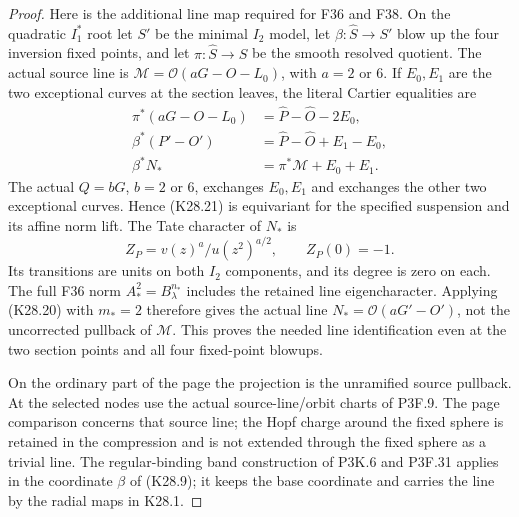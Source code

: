 \begin{proof}
Here is the additional line map required for F36 and F38. On the
quadratic \(I_1^*\) root let \(S'\) be the minimal \(I_2\) model,
let \(\beta:\widehat S\to S'\) blow up the four inversion fixed
points, and let \(\pi:\widehat S\to S\) be the smooth resolved
quotient. The actual source line is
\(\mathcal M=\mathcal O(aG-O-L_0)\), with \(a=2\) or \(6\).
If \(E_0,E_1\) are the two exceptional curves at the section leaves,
the literal Cartier equalities are
\[
 \begin{split}
 \pi^*(aG-O-L_0)&=\widehat P-\widehat O-2E_0,\\
 \beta^*(P'-O')&=\widehat P-\widehat O+E_1-E_0,\\
 \beta^*N_*&=\pi^*\mathcal M+E_0+E_1 .
 \end{split}
 \tag{K28.21}
\]
The actual \(Q=bG\), \(b=2\) or \(6\), exchanges \(E_0,E_1\)
and exchanges the other two exceptional curves. Hence (K28.21)
is equivariant for the specified suspension and its affine norm lift.
The Tate character of \(N_*\) is
\[
             Z_P=v(z)^a/u(z^2)^{a/2},\qquad Z_P(0)=-1 .
 \tag{K28.22}
\]
Its transitions are units on both \(I_2\) components, and its degree is
zero on each. The full F36 norm
\(A_*^2=B_\lambda^{n_*}\) includes the retained line eigencharacter.
Applying (K28.20) with \(m_*=2\) therefore gives the actual line
\(N_*=\mathcal O(aG'-O')\), not the uncorrected pullback of
\(\mathcal M\). This proves the needed line identification even at
the two section points and all four fixed-point blowups.

On the ordinary part of the page the projection is the unramified
source pullback. At the selected nodes use the actual source-line/orbit
charts of P3F.9. The page comparison concerns that source line; the
Hopf charge around the fixed sphere is retained in the compression
and is not extended through the fixed sphere as a trivial line.
The regular-binding band construction of P3K.6 and P3F.31 applies
in the coordinate \(\beta\) of (K28.9); it keeps the base coordinate
and carries the line by the radial maps in K28.1.


\end{proof}
